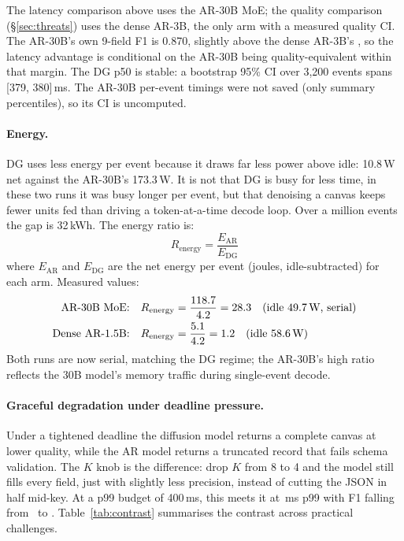 The latency comparison above uses the AR-30B MoE; the quality
comparison (\S\ref{sec:threats}) uses the dense AR-3B, the only arm
with a measured quality CI. The AR-30B's own 9-field F1 is 0.870,
slightly above the dense AR-3B's \arThreeBFnine, so the latency
advantage is conditional on the AR-30B being quality-equivalent
within that margin. The DG p50 is stable: a bootstrap 95\% CI over
3{,}200 events spans [379, 380]\,ms. The AR-30B per-event timings
were not saved (only summary percentiles), so its CI is uncomputed.

\paragraph{Energy.}

DG uses less energy per event because it draws far
less power above idle: 10.8\,W net against the AR-30B's 173.3\,W. It is
not that DG is busy for less time, in these two runs it was busy
longer per event, but that denoising a canvas keeps fewer units fed
than driving a token-at-a-time decode loop. Over a million events the
gap is 32\,kWh. The energy ratio is:
\begin{equation}
R_{\mathrm{energy}} = \frac{E_{\mathrm{AR}}}{E_{\mathrm{DG}}}
\end{equation}
where $E_{\mathrm{AR}}$ and $E_{\mathrm{DG}}$ are the net energy per
event (joules, idle-subtracted) for each arm. Measured values:
\begin{align}
\text{AR-30B MoE:} \quad & R_{\mathrm{energy}} =
\frac{118.7}{4.2} = 28.3 \quad \text{(idle 49.7\,W, serial)} \\
\text{Dense AR-1.5B:} \quad & R_{\mathrm{energy}} =
\frac{5.1}{4.2} = 1.2 \quad \text{(idle 58.6\,W)}
\end{align}
Both runs are now serial, matching the DG regime; the AR-30B's high
ratio reflects the 30B model's memory traffic during single-event
decode.

\paragraph{Graceful degradation under deadline pressure.}

Under a tightened deadline the diffusion model returns a complete canvas
at lower quality, while the AR model returns a truncated record that
fails schema validation. The $K$ knob is the difference: drop $K$ from
8 to 4 and the model still fills every field, just with slightly
less precision, instead of cutting the JSON in half mid-key. At a
p99 budget of 400\,ms, this meets it at \kFourPninetynine\,ms p99 with
F1 falling from \kEightFone\ to \kFourFone. Table~\ref{tab:contrast}
summarises the contrast across practical challenges.

